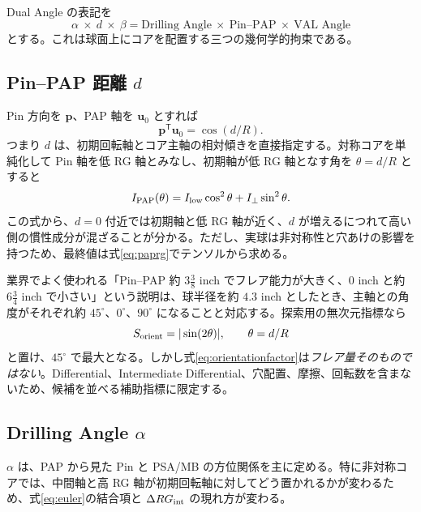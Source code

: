 \documentclass[11pt,a4paper]{article}
\newcommand{\vect}[1]{\bm{#1}}
\begin{document}
Dual Angle の表記を
\begin{equation}
 \boxed{\alpha\ \times\ d\ \times\ \beta}
 =\boxed{\text{Drilling Angle}\ \times\ \text{Pin--PAP}\ \times\ \text{VAL Angle}}
\end{equation}
とする。これは球面上にコアを配置する三つの幾何学的拘束である\cite{morrich}。

\subsection{Pin--PAP 距離 $d$}

Pin 方向を $\vect p$、PAP 軸を $\vect u_0$ とすれば
\begin{equation}
 \vect p^{\mathsf T}\vect u_0=\cos(d/R).
 \label{eq:pinpap}
\end{equation}
つまり $d$ は、初期回転軸とコア主軸の相対傾きを直接指定する。対称コアを単純化して Pin 軸を低 RG 軸とみなし、初期軸が低 RG 軸となす角を $\theta=d/R$ とすると
\begin{equation}
 I_{\rm PAP}(\theta)
 =I_{\rm low}\cos^2\theta+I_{\perp}\sin^2\theta.
 \label{eq:axisinertia}
\end{equation}
この式から、$d=0$ 付近では初期軸と低 RG 軸が近く、$d$ が増えるにつれて高い側の慣性成分が混ざることが分かる。ただし、実球は非対称性と穴あけの影響を持つため、最終値は式\eqref{eq:paprg}でテンソルから求める。

業界でよく使われる「Pin--PAP 約 $3\frac{3}{8}$ inch でフレア能力が大きく、0 inch と約 $6\frac{3}{4}$ inch で小さい」という説明は、球半径を約 $4.3$ inch としたとき、主軸との角度がそれぞれ約 $45^\circ$、$0^\circ$、$90^\circ$ になることと対応する。探索用の無次元指標なら
\begin{equation}
 S_{\rm orient}=|\sin(2\theta)|,
 \qquad \theta=d/R
 \label{eq:orientationfactor}
\end{equation}
と置け、$45^\circ$ で最大となる。しかし式\eqref{eq:orientationfactor}は\emph{フレア量そのものではない}。Differential、Intermediate Differential、穴配置、摩擦、回転数を含まないため、候補を並べる補助指標に限定する。

\subsection{Drilling Angle $\alpha$}

$\alpha$ は、PAP から見た Pin と PSA/MB の方位関係を主に定める。特に非対称コアでは、中間軸と高 RG 軸が初期回転軸に対してどう置かれるかが変わるため、式\eqref{eq:euler}の結合項と $\Delta RG_{\rm int}$ の現れ方が変わる。
\end{document}
